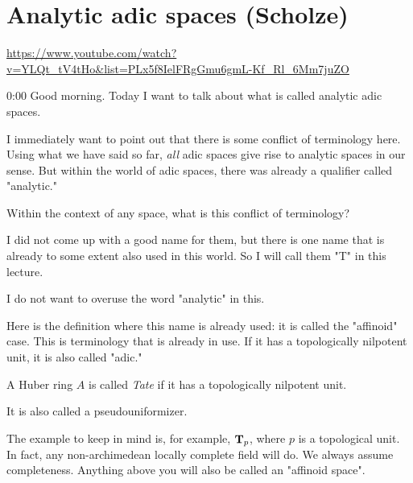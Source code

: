 
\section{\ufs Analytic adic spaces (Scholze)}

\url{https://www.youtube.com/watch?v=YLQt_tV4tHo&list=PLx5f8IelFRgGmu6gmL-Kf_Rl_6Mm7juZO}
\renewcommand{\yt}[2]{\href{https://www.youtube.com/watch?v=YLQt_tV4tHo&list=PLx5f8IelFRgGmu6gmL-Kf_Rl_6Mm7juZO&t=#1}{#2}}
\vspace{1em}

\begin{unfinished}{0:00}
Good morning. Today I want to talk about what is called analytic adic spaces.

I immediately want to point out that there is some conflict of terminology here. 
Using what we have said so far, \emph{all} adic spaces give rise to analytic spaces in our sense. 
But within the world of adic spaces, there was already a qualifier called "analytic."

%
Within the context of any space, what is this conflict of terminology?  

I did not come up with a good name for them, but there is one name that is already to some extent also used in this world. 
So I will call them "T" in this lecture. 


I do not want to overuse the word "analytic" in this.

%
Here is the definition where this name is already used: it is called the "affinoid" case. 
This is terminology that is already in use. If it has a topologically nilpotent unit, it is also called "adic."

\begin{definition}[Tate]
A Huber ring $A$ is called \emph{Tate} if it has a topologically nilpotent unit.
\end{definition}

\begin{remark}
It is also called a pseudouniformizer.
\end{remark}

The example to keep in mind is, for example, $\mathbf T_p$, where $p$ is a topological unit. 
In fact, any non-archimedean locally complete field will do. 
We always assume completeness. Anything above you will also be called an "affinoid space".


\end{unfinished}
